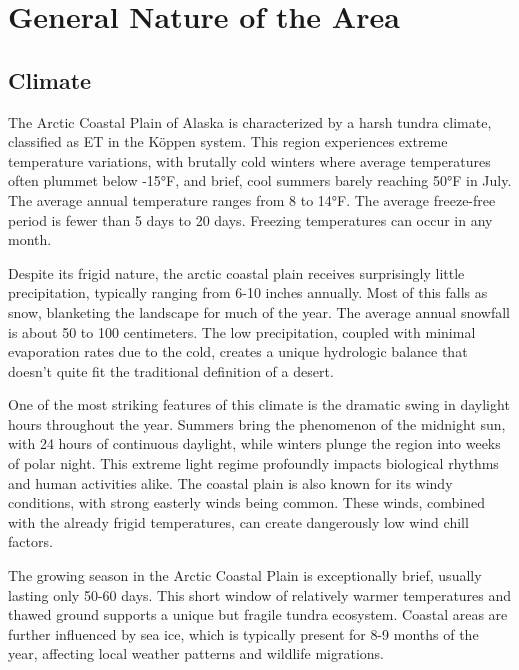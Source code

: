 \documentclass[
]{book}
\theoremstyle{definition}
\theoremstyle{definition}
\theoremstyle{definition}
\theoremstyle{definition}
\theoremstyle{remark}
\begin{document}
\hypertarget{general-nature-of-the-area}{%
\chapter{General Nature of the Area}\label{general-nature-of-the-area}}

\hypertarget{climate}{%
\section{Climate}\label{climate}}

The Arctic Coastal Plain of Alaska is characterized by a harsh tundra climate, classified as ET in the Köppen system. This region experiences extreme temperature variations, with brutally cold winters where average temperatures often plummet below -15°F, and brief, cool summers barely reaching 50°F in July. The average annual temperature ranges from 8 to 14°F. The average freeze-free period is fewer than 5 days to 20 days. Freezing temperatures can occur in any month.

Despite its frigid nature, the arctic coastal plain receives surprisingly little precipitation, typically ranging from 6-10 inches annually. Most of this falls as snow, blanketing the landscape for much of the year. The average annual snowfall is about 50 to 100 centimeters. The low precipitation, coupled with minimal evaporation rates due to the cold, creates a unique hydrologic balance that doesn't quite fit the traditional definition of a desert.

One of the most striking features of this climate is the dramatic swing in daylight hours throughout the year. Summers bring the phenomenon of the midnight sun, with 24 hours of continuous daylight, while winters plunge the region into weeks of polar night. This extreme light regime profoundly impacts biological rhythms and human activities alike. The coastal plain is also known for its windy conditions, with strong easterly winds being common. These winds, combined with the already frigid temperatures, can create dangerously low wind chill factors.

The growing season in the Arctic Coastal Plain is exceptionally brief, usually lasting only 50-60 days. This short window of relatively warmer temperatures and thawed ground supports a unique but fragile tundra ecosystem. Coastal areas are further influenced by sea ice, which is typically present for 8-9 months of the year, affecting local weather patterns and wildlife migrations.
\end{document}

